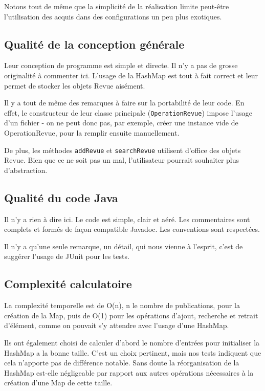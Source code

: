 \documentclass[a4paper,10pt]{article}
\begin{document}
	Notons tout de même que la simplicité de la réalisation limite peut-être l'utilisation des acquis dans des configurations un peu plus exotiques.

\subsection{Qualité de la conception générale}

	Leur conception de programme est simple et directe. Il n'y a pas de grosse originalité à commenter ici. L'usage de la HashMap est tout à fait correct et leur permet de stocker les objets Revue aisément.
	
	Il y a tout de même des remarques à faire sur la portabilité de leur code. En effet, le constructeur de leur classe principale (\texttt{OperationRevue}) impose l'usage d'un fichier - on ne peut donc pas, par exemple, créer une instance vide de OperationRevue, pour la remplir ensuite manuellement.
	
	De plus, les méthodes \texttt{addRevue} et \texttt{searchRevue} utilisent d'office des objets Revue. Bien que ce ne soit pas un mal, l'utilisateur pourrait souhaiter plus d'abstraction.

\subsection{Qualité du code Java}

	Il n'y a rien à dire ici. Le code est simple, clair et aéré. Les commentaires sont complets et formés de façon compatible Javadoc. Les conventions sont respectées.
	
	Il n'y a qu'une seule remarque, un détail, qui nous vienne à l'esprit, c'est de suggérer l'usage de JUnit pour les tests.

\subsection{Complexité calculatoire}

	La complexité temporelle est de O(n), n le nombre de publications, pour la création de la Map, puis de O(1) pour les opérations d'ajout, recherche et retrait d'élément, comme on pouvait s'y attendre avec l'usage d'une HashMap.
	
	Ils ont également choisi de calculer d'abord le nombre d'entrées pour initialiser la HashMap a la bonne taille. C'est un choix pertinent, mais nos tests indiquent que cela n'apporte pas de différence notable. Sans doute la réorganisation de la HashMap est-elle négligeable par rapport aux autres opérations nécessaires à la création d'une Map de cette taille.
	
\end{document}
